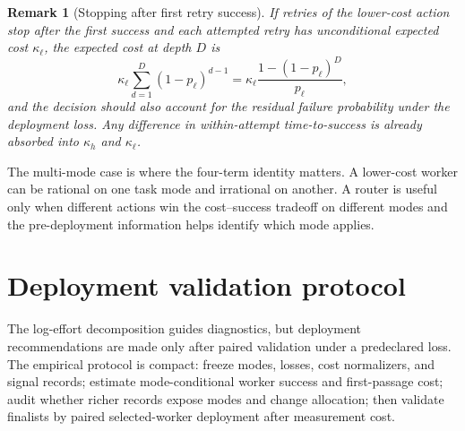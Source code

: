 \documentclass{article}
\newtheorem{remark}{Remark}
\begin{document}
\begin{remark}[Stopping after first retry success]
If retries of the lower-cost action stop after the first success and each attempted retry has unconditional expected cost $\kappa_\ell$, the expected cost at depth $D$ is
\[
\kappa_\ell\sum_{d=1}^{D}(1-p_\ell)^{d-1}
=
\kappa_\ell\frac{1-(1-p_\ell)^D}{p_\ell},
\]
and the decision should also account for the residual failure probability under the deployment loss.
Any difference in within-attempt time-to-success is already absorbed into $\kappa_h$ and $\kappa_\ell$.
\end{remark}

The multi-mode case is where the four-term identity matters.
A lower-cost worker can be rational on one task mode and irrational on another.
A router is useful only when different actions win the cost--success tradeoff on different modes and the pre-deployment information helps identify which mode applies.

\section{Deployment validation protocol}
\label{sec:selection}


The log-effort decomposition guides diagnostics, but deployment recommendations are made only after paired validation under a predeclared loss.
The empirical protocol is compact: freeze modes, losses, cost normalizers, and signal records; estimate mode-conditional worker success and first-passage cost; audit whether richer records expose modes and change allocation; then validate finalists by paired selected-worker deployment after measurement cost.
\end{document}
